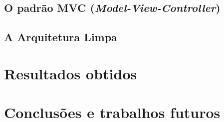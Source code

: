 \documentclass[12pt]{article}
\begin{document}
\subsection{O padrão MVC (\emph{Model-View-Controller})}



\subsection{A Arquitetura Limpa}



\section{Resultados obtidos}



\section{Conclusões e trabalhos futuros}



\raggedright


\end{document}
